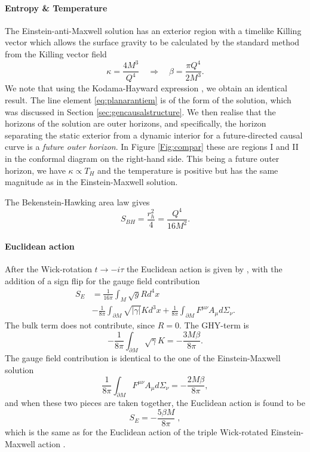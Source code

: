 \paragraph{Entropy \& Temperature}
The Einstein-anti-Maxwell solution has an exterior region with a timelike Killing vector which allows the surface gravity to be calculated by the standard method from the Killing vector field
\begin{equation*}
    \kappa = \frac{4M^3}{Q^4} \quad \Rightarrow \quad \beta = \frac{\pi Q^4}{2M^3}.
\end{equation*}
We note that using the Kodama-Hayward expression , we obtain an identical result. The line element \ref{eq:planarantiem} is of the form of the \sch solution, which was discussed in Section \ref{sec:gencausalstructure}. We then realise that the horizons of the solution are outer horizons, and specifically, the horizon separating the static exterior from a dynamic interior for a future-directed causal curve is a \emph{future outer horizon}. In Figure \ref{Fig:compar} these are regions I and II in the conformal diagram on the right-hand side. This being a future outer horizon, we have $\kappa \propto T_H$ and the temperature is positive but has the same magnitude as in the Einstein-Maxwell solution.

The Bekenstein-Hawking area law gives 
\begin{equation*}
    S_{BH} = \frac{r_h^2 }{4} = \frac{Q^4 }{16 M^2}.
\end{equation*}

\paragraph{Euclidean action}
After the Wick-rotation $t \rightarrow -i \tau$ the Euclidean action is given by , with the addition of a sign flip for the gauge field contribution 
\begin{equation*}
\begin{aligned}
            S_E 
        &= \frac{1}{16 \pi} \int_M \sqrt{g} R  d^4 x  \\
        &- \frac{1}{8 \pi} \int_{\partial M} \sqrt{|\gamma|} K  d^3x + \frac{1}{8 \pi} \int_{\partial M} F^{\mu \nu} A_{\mu} d\Sigma_{\nu}.
\end{aligned}
\end{equation*}
The bulk term does not contribute, since $R=0$. 
The GHY-term is
\begin{equation*}
    -\frac{1}{8\pi} \int_{\partial M} \sqrt{\gamma} K = -\frac{3M \beta}{8\pi} .
\end{equation*} 
The gauge field contribution is identical to the one of the Einstein-Maxwell solution
\begin{equation*}
    \frac{1}{8\pi} \int_{\partial M} F^{\mu \nu}A_\mu d\Sigma_\nu = - \frac{2 M \beta}{8 \pi} ,
\end{equation*}
and when these two pieces are taken together, the Euclidean action is found to be
\begin{equation*}
    S_E = - \frac{5\beta M}{8 \pi} \;,
\end{equation*}
which is the same as for the Euclidean action of the triple Wick-rotated Einstein-Maxwell action
 . 

